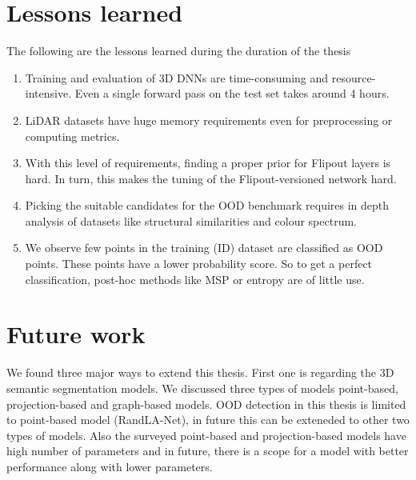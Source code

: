     \section{Lessons learned}
    The following are the lessons learned during the duration of the thesis
    \begin{enumerate}
        \item Training and evaluation of 3D DNNs are time-consuming and resource-intensive. Even a single forward pass on the test set takes around 4 hours.
        \item LiDAR datasets have huge memory requirements even for preprocessing or computing metrics.
        \item With this level of requirements, finding a proper prior for Flipout layers is hard. In turn, this makes the tuning of the Flipout-versioned network hard.
        \item Picking the suitable candidates for the OOD benchmark requires in depth analysis of datasets like structural similarities and colour spectrum.
        \item We observe few points in the training (ID) dataset are classified as OOD points. These points have a lower probability score. So to get a perfect classification, post-hoc methods like MSP or entropy are of little use.
    \end{enumerate}

    \section{Future work}
    
    We found three major ways to extend this thesis. 
    First one is regarding the 3D semantic segmentation models.
    We discussed three types of models point-based, projection-based and graph-based models.
    OOD detection in this thesis is limited to point-based model (RandLA-Net), in future this can be exteneded to other two types of models.
    Also the surveyed point-based and projection-based models have high number of parameters and in future, there is a scope for a model with better performance along with lower parameters.

